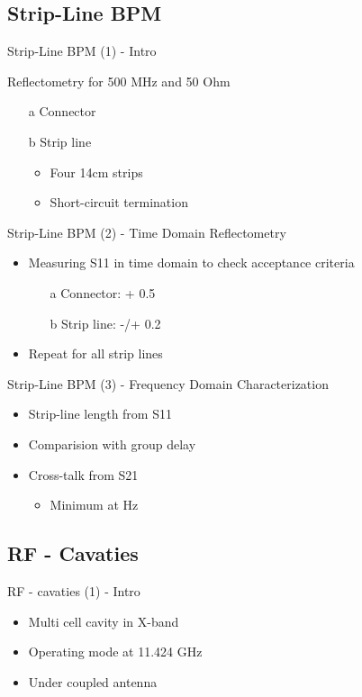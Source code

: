 \documentclass{beamer}
\begin{document}
\subsection{Strip-Line BPM}
\begin{frame}[t,fragile]{Strip-Line BPM (1) - Intro}

Reflectometry for 500 MHz and 50 Ohm
\begin{itemize}
\item[a] Connector
\item[b] Strip line
\begin{itemize}
\item Four 14cm strips
\item Short-circuit termination
\end{itemize}
\end{itemize}
\end{frame}

\begin{frame}[t,fragile]{Strip-Line BPM (2) - Time Domain Reflectometry}
\begin{itemize}
\item Measuring S11 in time domain to check acceptance criteria
\begin{itemize}
\item[a] Connector: + 0.5
\item[b] Strip line: -/+ 0.2
\end{itemize}
\item Repeat for all strip lines
\end{itemize}

\end{frame}

\begin{frame}[t,fragile]{Strip-Line BPM (3) - Frequency Domain Characterization}
\begin{itemize}
\item Strip-line length from S11
\item Comparision with group delay
\item Cross-talk from S21
\begin{itemize}
\item Minimum at Hz
\end{itemize}
\end{itemize}
\end{frame}

\subsection{RF - Cavaties}
\begin{frame}[t,fragile]{RF - cavaties (1) - Intro}
\begin{itemize}
\item Multi cell cavity in X-band
\item Operating mode at 11.424 GHz
\item Under coupled antenna
\end{itemize}
\end{frame}
\end{document}
